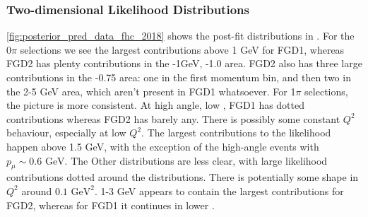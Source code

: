 \subsubsection{Two-dimensional Likelihood Distributions}
\autoref{fig:posterior_pred_data_fhc_2018} shows the post-fit distributions in \pmu \cosmu. For the 0$\pi$ selections we see the largest contributions above 1 GeV for FGD1, whereas FGD2 has plenty contributions in the -1GeV, -1.0 area. FGD2 also has three large contributions in the -0.75 area: one in the first momentum bin, and then two in the 2-5 GeV area, which aren't present in FGD1 whatsoever. For 1$\pi$ selections, the picture is more consistent. At high angle, low \pmu, FGD1 has dotted contributions whereas FGD2 has barely any. There is possibly some constant $Q^2$ behaviour, especially at low $Q^2$. The largest contributions to the likelihood happen above 1.5 GeV, with the exception of the high-angle events with $p_\mu \sim0.6\text{ GeV}$. The Other distributions are less clear, with large likelihood contributions dotted around the distributions. There is potentially some shape in $Q^2$ around $0.1\text{ GeV}^2$. 1-3 GeV appears to contain the largest contributions for FGD2, whereas for FGD1 it continues in lower \pmu.
